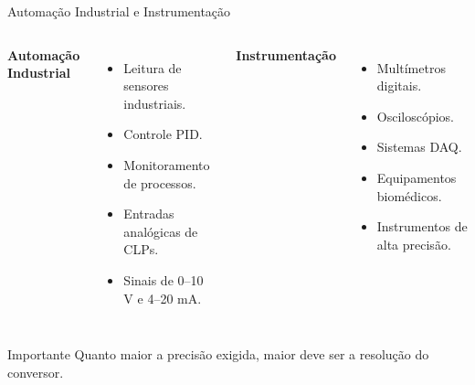 \documentclass{beamer}
\begin{document}
\begin{frame}{Automação Industrial e Instrumentação}
	
	\begin{columns}
		
		
		\textbf{Automação Industrial}
		
		\begin{itemize}
			\item Leitura de sensores industriais.
			\item Controle PID.
			\item Monitoramento de processos.
			\item Entradas analógicas de CLPs.
			\item Sinais de 0--10 V e 4--20 mA.
		\end{itemize}
		
		
		\textbf{Instrumentação}
		
		\begin{itemize}
			\item Multímetros digitais.
			\item Osciloscópios.
			\item Sistemas DAQ.
			\item Equipamentos biomédicos.
			\item Instrumentos de alta precisão.
		\end{itemize}
		
	\end{columns}
	
	\vspace{0.3cm}
	
	\begin{alertblock}{Importante}
		Quanto maior a precisão exigida, maior deve ser a resolução do conversor.
	\end{alertblock}
	
\end{frame}
\end{document}
